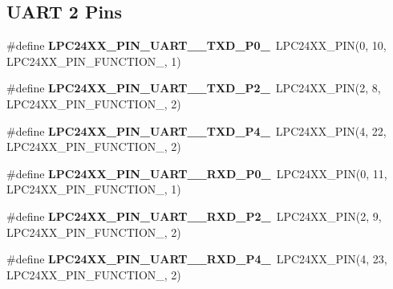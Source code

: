 \subsection*{U\+A\+RT 2 Pins}
\begin{DoxyCompactItemize}
\item 
\mbox{\label{group__lpc24xx__io_ga1a9d0277da6a8b0c7de6bfdcbce16d50}} 
\#define {\bfseries L\+P\+C24\+X\+X\+\_\+\+P\+I\+N\+\_\+\+U\+A\+R\+T\+\_\+\_\+\+T\+X\+D\+\_\+\+P0\+\_}~L\+P\+C24\+X\+X\+\_\+\+P\+IN(0, 10, L\+P\+C24\+X\+X\+\_\+\+P\+I\+N\+\_\+\+F\+U\+N\+C\+T\+I\+O\+N\+\_, 1)
\item 
\mbox{\label{group__lpc24xx__io_gaf4dc9abd4b44e0545888feabbf7cfd94}} 
\#define {\bfseries L\+P\+C24\+X\+X\+\_\+\+P\+I\+N\+\_\+\+U\+A\+R\+T\+\_\+\_\+\+T\+X\+D\+\_\+\+P2\+\_}~L\+P\+C24\+X\+X\+\_\+\+P\+IN(2, 8, L\+P\+C24\+X\+X\+\_\+\+P\+I\+N\+\_\+\+F\+U\+N\+C\+T\+I\+O\+N\+\_, 2)
\item 
\mbox{\label{group__lpc24xx__io_ga19360b7f65d362e5af9f1cec852abd85}} 
\#define {\bfseries L\+P\+C24\+X\+X\+\_\+\+P\+I\+N\+\_\+\+U\+A\+R\+T\+\_\+\_\+\+T\+X\+D\+\_\+\+P4\+\_}~L\+P\+C24\+X\+X\+\_\+\+P\+IN(4, 22, L\+P\+C24\+X\+X\+\_\+\+P\+I\+N\+\_\+\+F\+U\+N\+C\+T\+I\+O\+N\+\_, 2)
\item 
\mbox{\label{group__lpc24xx__io_ga17c908a2520a378b701266003963f5a7}} 
\#define {\bfseries L\+P\+C24\+X\+X\+\_\+\+P\+I\+N\+\_\+\+U\+A\+R\+T\+\_\+\_\+\+R\+X\+D\+\_\+\+P0\+\_}~L\+P\+C24\+X\+X\+\_\+\+P\+IN(0, 11, L\+P\+C24\+X\+X\+\_\+\+P\+I\+N\+\_\+\+F\+U\+N\+C\+T\+I\+O\+N\+\_, 1)
\item 
\mbox{\label{group__lpc24xx__io_gabee61cee2c43a10256f02374f9c0f52e}} 
\#define {\bfseries L\+P\+C24\+X\+X\+\_\+\+P\+I\+N\+\_\+\+U\+A\+R\+T\+\_\+\_\+\+R\+X\+D\+\_\+\+P2\+\_}~L\+P\+C24\+X\+X\+\_\+\+P\+IN(2, 9, L\+P\+C24\+X\+X\+\_\+\+P\+I\+N\+\_\+\+F\+U\+N\+C\+T\+I\+O\+N\+\_, 2)
\item 
\mbox{\label{group__lpc24xx__io_ga53a6a5bf9908e134d8cef1d0e7435916}} 
\#define {\bfseries L\+P\+C24\+X\+X\+\_\+\+P\+I\+N\+\_\+\+U\+A\+R\+T\+\_\+\_\+\+R\+X\+D\+\_\+\+P4\+\_}~L\+P\+C24\+X\+X\+\_\+\+P\+IN(4, 23, L\+P\+C24\+X\+X\+\_\+\+P\+I\+N\+\_\+\+F\+U\+N\+C\+T\+I\+O\+N\+\_, 2)
\end{DoxyCompactItemize}

